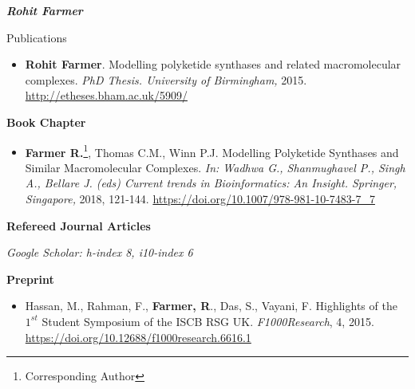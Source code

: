 \documentclass[10pt]{article}
\begin{document}
\begin{cv}{\huge \it \bfseries Rohit Farmer}
\renewenvironment{thebibliography}[1]{
\setlength{\topsep}{0em}
\setlength{\labelsep}{.5em}
\begin{etaremune}{
\setlength{\itemsep}{0.5em}}
}{\end{etaremune}}
\renewcommand{\bibitem}[1]{\item}

\setlength{\cvlabelsep}{0mm}
\setlength{\cvlabelwidth}{0mm}
\renewcommand{\labelitemi}{}

\vspace{1em}

\begin{cvlist}{Publications}

\item {\begin{itemize}\item{\bf Rohit Farmer}. Modelling polyketide synthases and related macromolecular complexes. \emph{PhD Thesis. University of Birmingham,} 2015. \url{http://etheses.bham.ac.uk/5909/} \end{itemize}}

\vskip3pt
\item {\textbf{Book Chapter}}
\item {\begin{itemize}\item{\bf Farmer R.}\footnote{Corresponding Author}, Thomas C.M., Winn P.J. Modelling Polyketide Synthases and Similar Macromolecular Complexes. \emph{In: Wadhwa G., Shanmughavel P., Singh A., Bellare J. (eds) Current trends in Bioinformatics: An Insight. Springer, Singapore,} 2018, 121-144. \url{https://doi.org/10.1007/978-981-10-7483-7_7} \end{itemize}}

\vskip3pt
\item {\bf Refereed Journal Articles}
\item {\textit{Google Scholar: h-index 8, i10-index 6}}
\vskip3pt
\item{ }


\vskip3pt
\item {\textbf{Preprint}}
\item {\begin{itemize}\item Hassan, M.,  Rahman, F., \textbf{Farmer, R}., Das, S., Vayani, F. Highlights of the $1^{st}$ Student Symposium of the ISCB RSG UK. \emph{F1000Research}, 4, 2015. \url{https://doi.org/10.12688/f1000research.6616.1} \end{itemize}}

\end{cvlist}
\end{cv}
\end{document}
